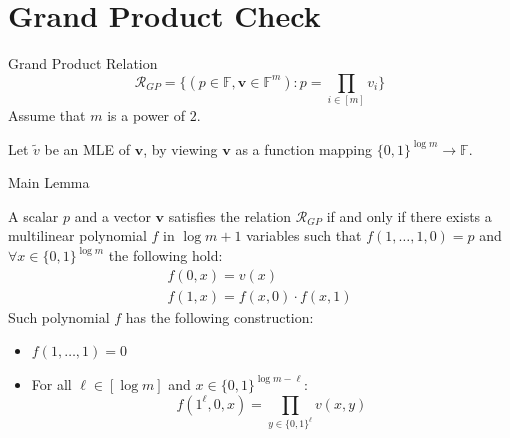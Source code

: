 \documentclass{zkdl-presentation-template}
\begin{document}
    \section{Grand Product Check}

    \begin{frame}{Grand Product Relation}
        \begin{equation*}
        \mathcal{R}_{GP} = \big\{ (p \in \mathbb{F}, \mathbf{v} \in \mathbb{F}^m)\colon p = \prod_{i \in [m]} v_i \big\}
        \end{equation*}
        Assume that $m$ is a power of $2$.
        \pause

        Let $\widetilde{v}$ be an MLE of $\mathbf{v}$, by viewing $\mathbf{v}$ as a
        function mapping $\{0,1\}^{\log m} \rightarrow \mathbb{F}$.
    \end{frame}

    \begin{frame}{Main Lemma}
        \begin{lemma}
        A scalar $p$ and a vector $\mathbf{v}$ satisfies the relation $\mathcal{R}_{GP}$ if and only if there exists a
        multilinear polynomial $f$ in $\log m + 1$ variables such that $f(1,\dots,1, 0) = p$ and $\forall x \in \{0,1\}^{\log m}$
        the following hold:
        \begin{gather*}
        f(0, x) = v(x)\\
        f(1,x) = f(x, 0) \cdot f(x, 1)
        \end{gather*}
        \pause
        Such polynomial $f$ has the following construction: \begin{itemize}
            \item $f(1,\dots,1) = 0$
            \item For all $\ell \in [\log m]$ and $x \in \{0,1\}^{\log m - \ell}$: \\
            \vspace{-0.8em}
            \begin{equation*}
                f(1^\ell, 0, x) = \prod_{y \in \{0,1\}^\ell}v(x,y)
            \end{equation*}
        \end{itemize}
        \end{lemma}
    \end{frame}
\end{document}
